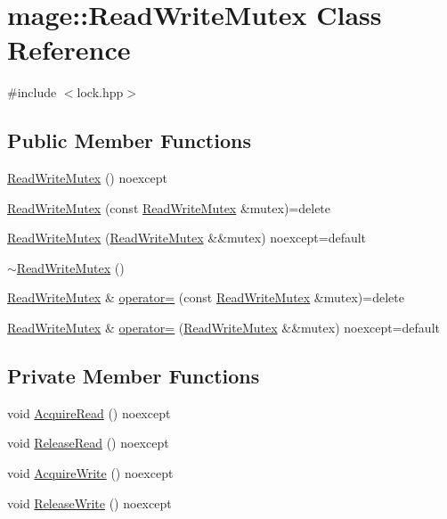 \hypertarget{classmage_1_1_read_write_mutex}{}\section{mage\+:\+:Read\+Write\+Mutex Class Reference}
\label{classmage_1_1_read_write_mutex}


{\ttfamily \#include $<$lock.\+hpp$>$}

\subsection*{Public Member Functions}
\begin{DoxyCompactItemize}
\item 
\hyperlink{classmage_1_1_read_write_mutex_aa206018373d39aef48b6e465909a75a5}{Read\+Write\+Mutex} () noexcept
\item 
\hyperlink{classmage_1_1_read_write_mutex_aacb2f69e7e2b084147e1e45628e9dd67}{Read\+Write\+Mutex} (const \hyperlink{classmage_1_1_read_write_mutex}{Read\+Write\+Mutex} \&mutex)=delete
\item 
\hyperlink{classmage_1_1_read_write_mutex_a35e15c17527ef771920129c4e381eb17}{Read\+Write\+Mutex} (\hyperlink{classmage_1_1_read_write_mutex}{Read\+Write\+Mutex} \&\&mutex) noexcept=default
\item 
\hyperlink{classmage_1_1_read_write_mutex_a73676d9414658d63edfe443ee1d55c8b}{$\sim$\+Read\+Write\+Mutex} ()
\item 
\hyperlink{classmage_1_1_read_write_mutex}{Read\+Write\+Mutex} \& \hyperlink{classmage_1_1_read_write_mutex_a408e06f3c8bcc644e43afbf7e9ac772f}{operator=} (const \hyperlink{classmage_1_1_read_write_mutex}{Read\+Write\+Mutex} \&mutex)=delete
\item 
\hyperlink{classmage_1_1_read_write_mutex}{Read\+Write\+Mutex} \& \hyperlink{classmage_1_1_read_write_mutex_a8fe8592d73b6705a0bf8470102c5d550}{operator=} (\hyperlink{classmage_1_1_read_write_mutex}{Read\+Write\+Mutex} \&\&mutex) noexcept=default
\end{DoxyCompactItemize}
\subsection*{Private Member Functions}
\begin{DoxyCompactItemize}
\item 
void \hyperlink{classmage_1_1_read_write_mutex_add04196fda61967f81901bcba79938bc}{Acquire\+Read} () noexcept
\item 
void \hyperlink{classmage_1_1_read_write_mutex_a4fbd8ad3d47e07307c31a4e212305744}{Release\+Read} () noexcept
\item 
void \hyperlink{classmage_1_1_read_write_mutex_ab99adb4241990fa0dd2d3ba03322d1c3}{Acquire\+Write} () noexcept
\item 
void \hyperlink{classmage_1_1_read_write_mutex_ad520a65bee5a8ac04671ee93895d9b28}{Release\+Write} () noexcept
\end{DoxyCompactItemize}
